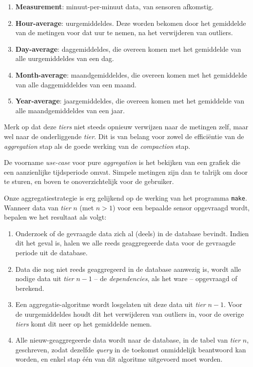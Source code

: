 \documentclass[12pt,draft,parskip=full]{article}
\begin{document}
\begin{enumerate}
	\item \textbf{Measurement}: minuut-per-minuut data, van sensoren afkomstig.
	
	\item \textbf{Hour-average}: uurgemiddeldes. Deze worden bekomen door het gemiddelde van de metingen voor dat uur te nemen, na het verwijderen van outliers.
	
	\item \textbf{Day-average}: daggemiddeldes, die overeen komen met het gemiddelde van alle uurgemiddeldes van een dag.
	
	\item \textbf{Month-average}: maandgemiddeldes, die overeen komen met het gemiddelde van alle daggemiddeldes van een maand.
	
	\item \textbf{Year-average}: jaargemiddeldes, die overeen komen met het gemiddelde van alle maandgemiddeldes van een jaar.
\end{enumerate}

Merk op dat deze \emph{tiers} niet steeds opnieuw verwijzen naar de metingen zelf, maar wel naar de onderliggende \emph{tier}. Dit is van belang voor zowel de effici\"entie van de \emph{aggregation} stap als de goede werking van de \emph{compaction} stap.

De voorname \emph{use-case} voor pure \emph{aggregation} is het bekijken van een grafiek die een aanzienlijke tijdsperiode omvat. Simpele metingen zijn dan te talrijk om door te sturen, en boven te onoverzichtelijk voor de gebruiker. 

Onze aggregatiestrategie is erg gelijkend op de werking van het programma \texttt{make}. Wanneer data van \emph{tier} $n$ (met $n > 1$) voor een bepaalde sensor opgevraagd wordt, bepalen we het resultaat als volgt:

\begin{enumerate}
	\item Onderzoek of de gevraagde data zich al (deels) in de database bevindt. Indien dit het geval is, halen we alle reeds geaggregeerde data voor de gevraagde periode uit de database.
	
	\item Data die nog niet reeds geaggregeerd in de database aanwezig is, wordt alle nodige data uit \emph{tier} $n - 1$ -- de \emph{dependencies}, als het ware -- opgevraagd of berekend.
	
	\item Een aggregatie-algoritme wordt losgelaten uit deze data uit \emph{tier} $n - 1$. Voor de uurgemiddeldes houdt dit het verwijderen van outliers in, voor de overige \emph{tiers} komt dit neer op het gemiddelde nemen.
	
	\item Alle nieuw-geaggregeerde data wordt naar de database, in de tabel van \emph{tier} $n$, geschreven, zodat dezelfde \emph{query} in de toekomst onmiddelijk beantwoord kan worden, en enkel stap \'e\'en van dit algoritme uitgevoerd moet worden.
\end{enumerate}
\end{document}
